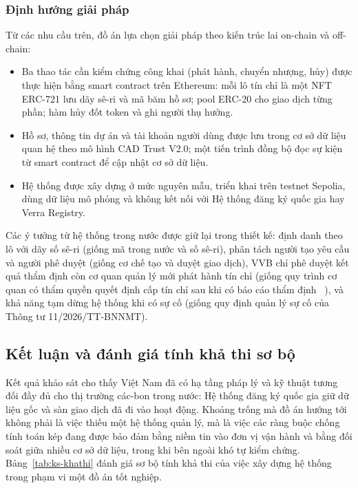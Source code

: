 \subsubsection*{Định hướng giải pháp}

Từ các nhu cầu trên, đồ án lựa chọn giải pháp theo kiến trúc lai on-chain và off-chain:
\begin{itemize}
    \item Ba thao tác cần kiểm chứng công khai (phát hành, chuyển nhượng, hủy) được thực hiện bằng smart contract trên Ethereum: mỗi lô tín chỉ là một NFT ERC-721 lưu dãy sê-ri và mã băm hồ sơ; pool ERC-20 cho giao dịch từng phần; hàm hủy đốt token và ghi người thụ hưởng.
    \item Hồ sơ, thông tin dự án và tài khoản người dùng được lưu trong cơ sở dữ liệu quan hệ theo mô hình CAD Trust V2.0; một tiến trình đồng bộ đọc sự kiện từ smart contract để cập nhật cơ sở dữ liệu.
    \item Hệ thống được xây dựng ở mức nguyên mẫu, triển khai trên testnet Sepolia, dùng dữ liệu mô phỏng và không kết nối với Hệ thống đăng ký quốc gia hay Verra Registry.
\end{itemize}
Các ý tưởng từ hệ thống trong nước được giữ lại trong thiết kế: định danh theo lô với dãy số sê-ri (giống mã trong nước và số sê-ri), phân tách người tạo yêu cầu và người phê duyệt (giống cơ chế tạo và duyệt giao dịch), VVB chỉ phê duyệt kết quả thẩm định còn cơ quan quản lý mới phát hành tín chỉ (giống quy trình cơ quan có thẩm quyền quyết định cấp tín chỉ sau khi có báo cáo thẩm định~\cite{mae2025qd2935} \cite{vietnam2026nghidinh396}), và khả năng tạm dừng hệ thống khi có sự cố (giống quy định quản lý sự cố của Thông tư 11/2026/TT-BNNMT).

\FloatBarrier
\subsection*{Kết luận và đánh giá tính khả thi sơ bộ}
\label{subsec:ks-khathi}

Kết quả khảo sát cho thấy Việt Nam đã có hạ tầng pháp lý và kỹ thuật tương đối đầy đủ cho thị trường các-bon trong nước: Hệ thống đăng ký quốc gia giữ dữ liệu gốc và sàn giao dịch đã đi vào hoạt động. Khoảng trống mà đồ án hướng tới không phải là việc thiếu một hệ thống quản lý, mà là việc các ràng buộc chống tính toán kép đang được bảo đảm bằng niềm tin vào đơn vị vận hành và bằng đối soát giữa nhiều cơ sở dữ liệu, trong khi bên ngoài khó tự kiểm chứng. Bảng~\ref{tab:ks-khathi} đánh giá sơ bộ tính khả thi của việc xây dựng hệ thống trong phạm vi một đồ án tốt nghiệp.

